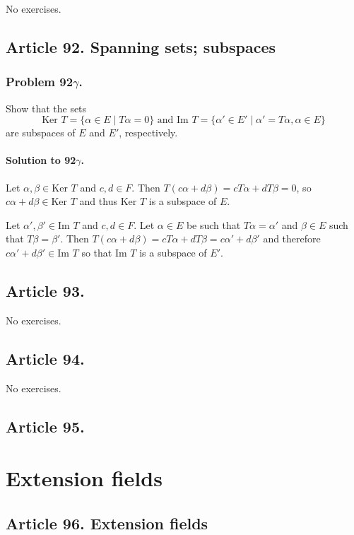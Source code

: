 No exercises.
\subsection{Article 92. Spanning sets; subspaces}

\subsubsection{Problem 92$\gamma$.}
Show that the sets
$$ \mbox{Ker } T = \{ \alpha \in E \mid T\alpha = 0 \} \mbox{ and }
\mbox{Im } T = \{ \alpha ' \in E' \mid \alpha ' = T\alpha, \alpha \in E \}$$
are subspaces of $E$ and $E'$, respectively.

\paragraph*{Solution to 92$\gamma$.}
Let $\alpha, \beta \in \mbox{Ker } T$ and $c, d \in F$. Then $T(c\alpha + d\beta)
= c T \alpha + d T \beta = 0$, so $c\alpha + d\beta \in \mbox{Ker } T$ and thus
$\mbox{Ker } T$ is a subspace of $E$.

Let $\alpha ', \beta ' \in \mbox{Im } T$ and $c, d \in F$. Let $\alpha \in E$ be
such that $T\alpha = \alpha '$ and $\beta \in E$ such that $T\beta = \beta '$.
Then $T(c \alpha + d \beta) = c T \alpha + d T \beta = c \alpha ' + d \beta '$
and therefore $c \alpha ' + d \beta ' \in \mbox{Im } T$ so that $\mbox{Im } T$ is
a subspace of $E'$.
\subsection{Article 93.}

No exercises.
\subsection{Article 94.}

No exercises.
\subsection{Article 95.}


\section{Extension fields}


\subsection{Article 96. Extension fields}


